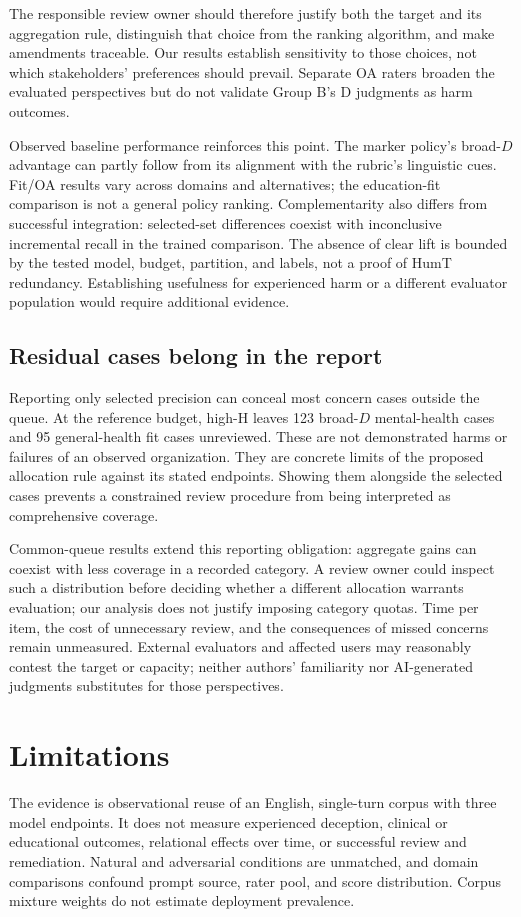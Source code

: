 \documentclass[manuscript,screen,review,anonymous]{acmart}
\begin{document}
The responsible review owner should therefore justify both the target and its aggregation rule, distinguish that choice from the ranking algorithm, and make amendments traceable. Our results establish sensitivity to those choices, not which stakeholders' preferences should prevail. Separate OA raters broaden the evaluated perspectives but do not validate Group B's D judgments as harm outcomes.

Observed baseline performance reinforces this point. The marker policy's broad-$D$ advantage can partly follow from its alignment with the rubric's linguistic cues. Fit/OA results vary across domains and alternatives; the education-fit comparison is not a general policy ranking. Complementarity also differs from successful integration: selected-set differences coexist with inconclusive incremental recall in the trained comparison. The absence of clear lift is bounded by the tested model, budget, partition, and labels, not a proof of HumT redundancy. Establishing usefulness for experienced harm or a different evaluator population would require additional evidence.

\subsection{Residual cases belong in the report}
Reporting only selected precision can conceal most concern cases outside the queue. At the reference budget, high-H leaves 123 broad-$D$ mental-health cases and 95 general-health fit cases unreviewed. These are not demonstrated harms or failures of an observed organization. They are concrete limits of the proposed allocation rule against its stated endpoints. Showing them alongside the selected cases prevents a constrained review procedure from being interpreted as comprehensive coverage.

Common-queue results extend this reporting obligation: aggregate gains can coexist with less coverage in a recorded category. A review owner could inspect such a distribution before deciding whether a different allocation warrants evaluation; our analysis does not justify imposing category quotas. Time per item, the cost of unnecessary review, and the consequences of missed concerns remain unmeasured. External evaluators and affected users may reasonably contest the target or capacity; neither authors' familiarity nor AI-generated judgments substitutes for those perspectives.

\section{Limitations}
The evidence is observational reuse of an English, single-turn corpus with three model endpoints. It does not measure experienced deception, clinical or educational outcomes, relational effects over time, or successful review and remediation. Natural and adversarial conditions are unmatched, and domain comparisons confound prompt source, rater pool, and score distribution. Corpus mixture weights do not estimate deployment prevalence.
\end{document}
